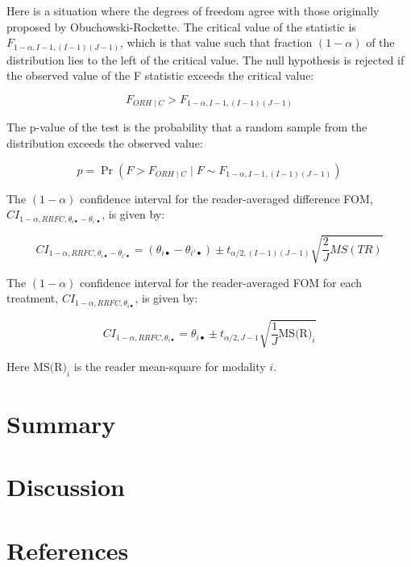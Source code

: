 \documentclass[
]{book}
\begin{document}
Here is a situation where the degrees of freedom agree with those originally proposed by Obuchowski-Rockette. The critical value of the statistic is \(F_{1-\alpha,I-1,(I-1)(J-1)}\), which is that value such that fraction \((1-\alpha)\) of the distribution lies to the left of the critical value. The null hypothesis is rejected if the observed value of the F statistic exceeds the critical value:

\[F_{ORH \mid C}>F_{1-\alpha,I-1,(I-1)(J-1)}\]

The p-value of the test is the probability that a random sample from the distribution exceeds the observed value:

\[p=\Pr(F>F_{ORH \mid C} \mid F \sim F_{1-\alpha,I-1,(I-1)(J-1)})\]

The \((1-\alpha)\) confidence interval for the reader-averaged difference FOM, \(CI_{1-\alpha,RRFC,\theta_{i \bullet} - \theta_{i' \bullet}}\), is given by:

\begin{equation}
CI_{1-\alpha,RRFC,\theta_{i \bullet} - \theta_{i' \bullet}} = (\theta_{i \bullet} - \theta_{i' \bullet}) \pm t_{\alpha/2, (I-1)(J-1)}\sqrt{\textstyle\frac{2}{J}MS(TR)}
\label{eq:CIDiffFomRRFC}
\end{equation}

The \((1-\alpha)\) confidence interval for the reader-averaged FOM for each treatment, \(CI_{1-\alpha,RRFC,\theta_{i \bullet}}\), is given by:

\begin{equation}
CI_{1-\alpha,RRFC,\theta_{i \bullet}} = \theta_{i \bullet} \pm t_{\alpha/2, J-1}\sqrt{\textstyle\frac{1}{J}\text{MS(R)}_i}
\label{eq:CIRRFCIndTrt}
\end{equation}

Here \(\text{MS(R)}_i\) is the reader mean-square for modality \(i\).

\hypertarget{ORAnalysisSigTesting-Summary}{%
\section{Summary}\label{ORAnalysisSigTesting-Summary}}

\hypertarget{ORAnalysisSigTesting-Discussion}{%
\section{Discussion}\label{ORAnalysisSigTesting-Discussion}}

\hypertarget{ORAnalysisSigTesting-references}{%
\section{References}\label{ORAnalysisSigTesting-references}}
\end{document}
